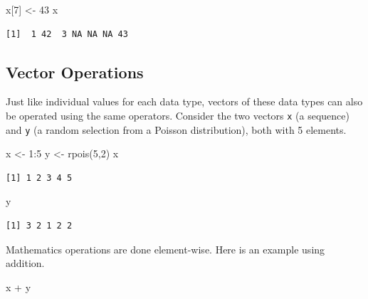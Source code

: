 \documentclass[
  letterpaper,
]{book}
\newenvironment{Shaded}{\begin{snugshade}}{\end{snugshade}}
\newcommand{\DecValTok}[1]{\textcolor[rgb]{0.68,0.00,0.00}{#1}}
\newcommand{\FunctionTok}[1]{\textcolor[rgb]{0.28,0.35,0.67}{#1}}
\newcommand{\NormalTok}[1]{\textcolor[rgb]{0.00,0.23,0.31}{#1}}
\newcommand{\OtherTok}[1]{\textcolor[rgb]{0.00,0.23,0.31}{#1}}
\newcommand{\SpecialCharTok}[1]{\textcolor[rgb]{0.37,0.37,0.37}{#1}}
\begin{document}
\begin{Shaded}
\begin{Highlighting}[]
\NormalTok{x[}\DecValTok{7}\NormalTok{] }\OtherTok{\textless{}{-}} \DecValTok{43}
\NormalTok{x}
\end{Highlighting}
\end{Shaded}

\begin{verbatim}
[1]  1 42  3 NA NA NA 43
\end{verbatim}

\subsection{Vector Operations}\label{vector-operations}

Just like individual values for each data type, vectors of these data
types can also be operated using the same operators. Consider the two
vectors \texttt{x} (a sequence) and \texttt{y} (a random selection from
a Poisson distribution), both with 5 elements.

\begin{Shaded}
\begin{Highlighting}[]
\NormalTok{x }\OtherTok{\textless{}{-}} \DecValTok{1}\SpecialCharTok{:}\DecValTok{5}
\NormalTok{y }\OtherTok{\textless{}{-}} \FunctionTok{rpois}\NormalTok{(}\DecValTok{5}\NormalTok{,}\DecValTok{2}\NormalTok{)}
\NormalTok{x}
\end{Highlighting}
\end{Shaded}

\begin{verbatim}
[1] 1 2 3 4 5
\end{verbatim}

\begin{Shaded}
\begin{Highlighting}[]
\NormalTok{y}
\end{Highlighting}
\end{Shaded}

\begin{verbatim}
[1] 3 2 1 2 2
\end{verbatim}

Mathematics operations are done element-wise. Here is an example using
addition.

\begin{Shaded}
\begin{Highlighting}[]
\NormalTok{x }\SpecialCharTok{+}\NormalTok{ y }
\end{Highlighting}
\end{Shaded}
\end{document}
